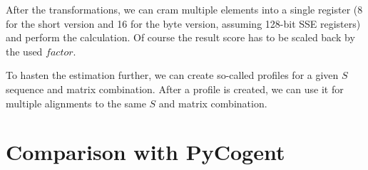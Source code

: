 \documentclass[12pt]{article}
\begin{document}
After the transformations, we can cram multiple elements into a single register (8 for the short version and 16 for the byte version, assuming 128-bit SSE registers) and perform the calculation. Of course the result score has to be scaled back by the used $factor$.

To hasten the estimation further, we can create so-called profiles for a given $S$ sequence and matrix combination. After a profile is created, we can use it for multiple alignments to the same $S$ and matrix combination.


\section{Comparison with PyCogent}
\label{compCogent}
\end{document}
